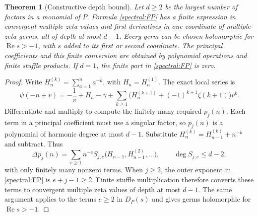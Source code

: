 \documentclass[11pt,a4paper]{article}
\numberwithin{equation}{section}
\newtheorem{theorem}{Theorem}[section]
\theoremstyle{definition}
\theoremstyle{remark}
\newcommand{\re}{\operatorname{Re}}
\begin{document}
\begin{theorem}[Constructive depth bound]\label{spectral:depth}
Let $d\geq2$ be the largest number of factors in a monomial of $P$.
Formula \eqref{spectral:FP} has a finite expression in convergent multiple
zeta values and first derivatives in one coordinate of multiple-zeta germs,
all of depth at most $d-1$.  Every germ can be chosen holomorphic for
$\re s>-1$, with $s$ added to its first or second coordinate.
The principal coefficients and this finite conversion
are obtained by polynomial operations and finite stuffle products.
If $d=1$, the finite part in \eqref{spectral:FP} is zero.
\end{theorem}

\begin{proof}
Write $H_n^{(k)}=\sum_{a=1}^na^{-k}$, with $H_n=H_n^{(1)}$.
The exact local series is
\begin{equation}\label{spectral:localH}
 \psi(-n+v)=-\frac1v+H_n-\gamma
   +\sum_{k\geq1}
       \bigl(H_n^{(k+1)}+(-1)^{k+1}\zeta(k+1)\bigr)v^k.
\end{equation}
Differentiate and multiply to compute the finitely many required
$p_j(n)$.  Each term in a principal coefficient must use a singular
factor, so $p_j(n)$ is a polynomial of harmonic degree at most $d-1$.
Substitute $H_n^{(k)}=H_{n-1}^{(k)}+n^{-k}$ and subtract.  Thus
\begin{equation}\label{spectral:differencepoly}
 \Delta p_j(n)=\sum_{e\geq1}n^{-e}
             S_{j,e}\bigl(H_{n-1},H_{n-1}^{(2)},\ldots\bigr),
 \qquad \deg S_{j,e}\leq d-2,
\end{equation}
with only finitely many nonzero terms.  When $j\geq2$, the outer exponent
in \eqref{spectral:FP} is $e+j-1\geq2$.  Finite stuffle multiplication
therefore converts these terms to convergent multiple zeta values of
depth at most $d-1$.  The same argument applies to the terms $e\geq2$
in $D_P(s)$ and gives germs holomorphic for $\re s>-1$.


\end{proof}
\end{document}
